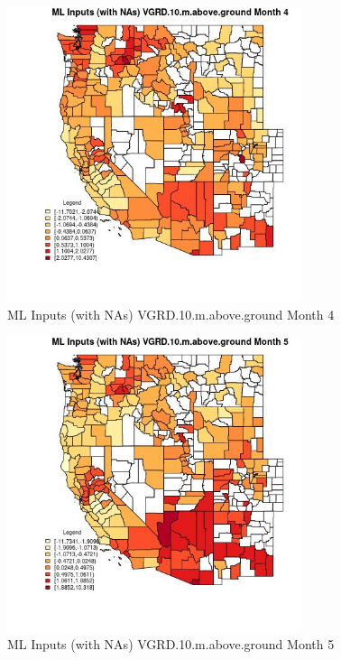 \begin{figure} 
\centering  
\includegraphics[width=0.77\textwidth]{Code_Outputs/Report_ML_input_PM25_Step4_part_f_de_duplicated_aveswNAs_CountyVGRD10mabovegroundmedianMonth4.jpg} 
\caption{\label{fig:Report_ML_input_PM25_Step4_part_f_de_duplicated_aveswNAsCountyVGRD10mabovegroundmedianMonth4}ML Inputs (with NAs) VGRD.10.m.above.ground Month 4} 
\end{figure} 
 

\begin{figure} 
\centering  
\includegraphics[width=0.77\textwidth]{Code_Outputs/Report_ML_input_PM25_Step4_part_f_de_duplicated_aveswNAs_CountyVGRD10mabovegroundmedianMonth5.jpg} 
\caption{\label{fig:Report_ML_input_PM25_Step4_part_f_de_duplicated_aveswNAsCountyVGRD10mabovegroundmedianMonth5}ML Inputs (with NAs) VGRD.10.m.above.ground Month 5} 
\end{figure} 
 

